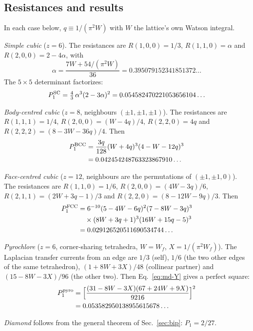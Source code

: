 \documentclass[aps,pre,10pt,twocolumn,superscriptaddress,nofootinbib]{revtex4-2}
\begin{document}
\subsection{Resistances and results}

In each case below, $q\equiv1/(\pi^2W)$ with $W$ the lattice's own Watson integral.

\emph{Simple cubic} ($z=6$). The resistances are $R(1,0,0)=1/3$, $R(1,1,0)=\alpha$ and
$R(2,0,0)=2-4\alpha$, with
\begin{equation}
\alpha=\frac{7W+54/(\pi^2W)}{36}=0.395079152341851372\ldots
\end{equation}
The $5\times5$ determinant factorizes:
\begin{equation}
P_1^{\rm SC}=\tfrac43\,\alpha^3(2-3\alpha)^2=0.054582470221053656104\ldots
\end{equation}

\emph{Body-centred cubic} ($z=8$, neighbours $(\pm1,\pm1,\pm1)$). The resistances are
$R(1,1,1)=1/4$, $R(2,0,0)=(W-4q)/4$, $R(2,2,0)=4q$ and $R(2,2,2)=(8-3W-36q)/4$. Then
\begin{align}
P_1^{\rm BCC}&=\frac{3q}{128}(W+4q)^3(4-W-12q)^3\nonumber\\
&=0.042454248763323867910\ldots
\end{align}

\emph{Face-centred cubic} ($z=12$, neighbours are the permutations of $(\pm1,\pm1,0)$). The resistances are
$R(1,1,0)=1/6$, $R(2,0,0)=(4W-3q)/6$, $R(2,1,1)=(2W+3q-1)/3$ and $R(2,2,0)=(8-12W-9q)/3$. Then
\begin{align}
P_1^{\rm FCC}&=6^{-10}(5-4W-6q)^2(7-8W-3q)^3\nonumber\\
&\quad\times(8W+3q+1)^3(16W+15q-5)^3\nonumber\\
&=0.029126520511690534744\ldots
\end{align}

\emph{Pyrochlore} ($z=6$, corner-sharing tetrahedra, $W=W_f$, $X=1/(\pi^2W_f)$). The Laplacian
transfer currents from an edge are $1/3$ (self), $1/6$ (the two other edges of the same
tetrahedron), $(1+8W+3X)/48$ (collinear partner) and $(15-8W-3X)/96$ (the other two). Then
Eq.~\eqref{eq:md-Y} gives a perfect square:
\begin{align}
P_1^{\rm pyro}&=\Bigl[\frac{(31-8W-3X)(67+24W+9X)}{9216}\Bigr]^2\nonumber\\
&=0.053582950138955615678\ldots
\end{align}

\emph{Diamond} follows from the general theorem of Sec.~\ref{sec:bip}: $P_1=2/27$.
\end{document}
